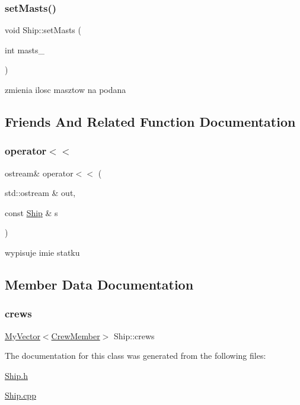 \subsubsection{\texorpdfstring{set\+Masts()}{setMasts()}}
{\footnotesize\ttfamily void Ship\+::set\+Masts (\begin{DoxyParamCaption}\item[{int}]{masts\+\_\+ }\end{DoxyParamCaption})\hspace{0.3cm}{\ttfamily [inline]}}



zmienia ilosc masztow na podana 



\subsection{Friends And Related Function Documentation}
\mbox{\label{class_ship_a9c719ebfe58cebdabd53ebc0f6c16627}} 
\subsubsection{\texorpdfstring{operator$<$$<$}{operator<<}}
{\footnotesize\ttfamily ostream\& operator$<$$<$ (\begin{DoxyParamCaption}\item[{std\+::ostream \&}]{out,  }\item[{const \hyperlink{class_ship}{Ship} \&}]{s }\end{DoxyParamCaption})\hspace{0.3cm}{\ttfamily [friend]}}



wypisuje imie statku 



\subsection{Member Data Documentation}
\mbox{\label{class_ship_a24150015bbbbf80f26f8384e93781600}} 
\subsubsection{\texorpdfstring{crews}{crews}}
{\footnotesize\ttfamily \hyperlink{class_my_vector}{My\+Vector}$<$\hyperlink{class_crew_member}{Crew\+Member}$>$ Ship\+::crews}



The documentation for this class was generated from the following files\+:\begin{DoxyCompactItemize}
\item 
\hyperlink{_ship_8h}{Ship.\+h}\item 
\hyperlink{_ship_8cpp}{Ship.\+cpp}\end{DoxyCompactItemize}
